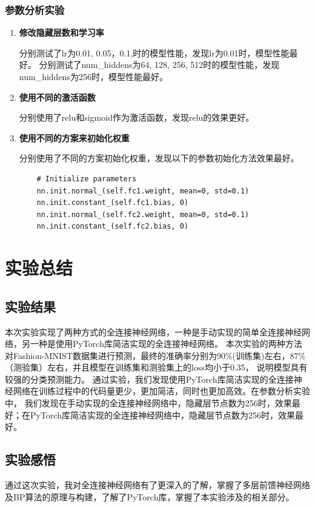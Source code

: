 \documentclass[12pt]{article}
\begin{document}
\subsubsection{参数分析实验}

\begin{enumerate}
  \item \textbf{修改隐藏层数和学习率}

        分别测试了lr为0.01, 0.05，0.1,时的模型性能，发现lr为0.01时，模型性能最好。
        分别测试了num\_hiddens为64, 128, 256, 512时的模型性能，发现num\_hiddens为256时，模型性能最好。
  \item \textbf{使用不同的激活函数}

        分别使用了relu和sigmoid作为激活函数，发现relu的效果更好。
  \item \textbf{使用不同的方案来初始化权重}

        分别使用了不同的方案初始化权重，发现以下的参数初始化方法效果最好。
        \begin{lstlisting}
    # Initialize parameters
    nn.init.normal_(self.fc1.weight, mean=0, std=0.1)
    nn.init.constant_(self.fc1.bias, 0)
    nn.init.normal_(self.fc2.weight, mean=0, std=0.1)
    nn.init.constant_(self.fc2.bias, 0)
  \end{lstlisting}

\end{enumerate}


\section{实验总结}

\subsection{实验结果}
本次实验实现了两种方式的全连接神经网络，一种是手动实现的简单全连接神经网络，另一种是使用PyTorch库简洁实现的全连接神经网络。
本次实验的两种方法对Fashion-MNIST数据集进行预测，最终的准确率分别为90\%(训练集)左右，87\%（测验集）左右，并且模型在训练集和测验集上的loss均小于0.35，
说明模型具有较强的分类预测能力。
通过实验，我们发现使用PyTorch库简洁实现的全连接神经网络在训练过程中的代码量更少，更加简洁，同时也更加高效。在参数分析实验中，
我们发现在手动实现的全连接神经网络中，隐藏层节点数为256时，效果最好；在PyTorch库简洁实现的全连接神经网络中，隐藏层节点数为256时，效果最好。

\subsection{实验感悟}
通过这次实验，我对全连接神经网络有了更深入的了解，掌握了多层前馈神经网络及BP算法的原理与构建，了解了PyTorch库，掌握了本实验涉及的相关部分。
\end{document}
